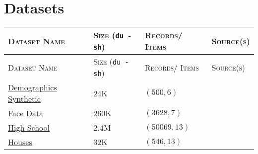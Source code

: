 \chapter{Datasets}\label{Datasets}



\begin{customArrayStretch}{1.3}
\begin{longtable}{
    |
    >{\RaggedRight\arraybackslash}p{5cm}| %
    >{\hfill}p{2.5cm}| %
    >{\hfill}p{3cm}| %
    >{\hfill}p{2cm}| %
}

\hline
    \textsc{Dataset Name} & 
    \textsc{Size} (\verb|du -sh|) & 
    \textsc{Records/ Items} & 
    \textsc{Source(s)} \\
\hline
\endfirsthead

\hline
    \textsc{Dataset Name} & 
    \textsc{Size} (\verb|du -sh|) & 
    \textsc{Records/ Items} & 
    \textsc{Source(s)} \\
\hline
\endhead

\hline \endfoot
\hline \endlastfoot




\href{http://www.nth-iteration.com/wp-content/uploads/2018/08/demographics-synthetic.csv}{Demographics Synthetic} \label{Datasets/nth-iteration/demographics-synthetic} & 
$24$K &
$(500, 6)$ & 
\cite{statistics/book/Statistics-for-Data-Scientists/Maurits-Kaptein} \\ \hline

\href{http://www.nth-iteration.com/wp-content/uploads/2018/08/face-data.csv}{Face Data} \label{Datasets/nth-iteration/face-data} & 
$260$K &
$(3628, 7)$ & 
\cite{statistics/book/Statistics-for-Data-Scientists/Maurits-Kaptein} \\ \hline

\href{http://www.nth-iteration.com/wp-content/uploads/2018/08/high-school.csv}{High School} \label{Datasets/nth-iteration/high-school} & 
$2.4$M &
$(50069, 13)$ & 
\cite{statistics/book/Statistics-for-Data-Scientists/Maurits-Kaptein} \\ \hline

\href{http://www.nth-iteration.com/wp-content/uploads/2018/08/houses.csv}{Houses} \label{Datasets/nth-iteration/houses} & 
$32$K &
$(546, 13)$ & 
\cite{statistics/book/Statistics-for-Data-Scientists/Maurits-Kaptein} \\ \hline


\end{longtable}
\end{customArrayStretch}

